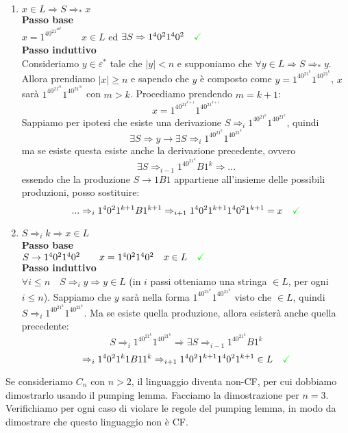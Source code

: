 \documentclass[a4paper,oneside]{scrbook}
\newcommand{\greenmark}{\quad \textcolor{green}{\checkmark}}
\begin{document}
\begin{enumerate}
	\item $x\in L \Rightarrow S \Rightarrow_* x $\\
	\textbf{Passo base}\\
	$x=1^40^21^40^2 \qquad x \in L$ ed $\exists S\Rightarrow 1^40^21^40^2 \greenmark $\\
	\textbf{Passo induttivo}\\
	Consideriamo $y \in \varepsilon^*$ tale che $|y|<n$ e supponiamo che $\forall y \in L \Rightarrow S \Rightarrow_* y$.\\
	Allora prendiamo $|x|\geq n$ e sapendo che $y$ è composto come $y=1^40^21^k1^40^21^k$, $x$ sarà $1^40^21^m1^40^21^m$ con $m>k$. Procediamo prendendo $m=k+1$:
	$$ x=1^40^21^{k+1}1^40^21^{k+1}$$
	Sappiamo per ipotesi che esiste una derivazione  $S\Rightarrow_i 1^40^21^k1^40^21^k$, quindi
	$$\exists S \Rightarrow y \rightarrow \exists S \Rightarrow_i 1^40^21^k1^40^21^k$$
	ma se esiste questa esiste anche la derivazione precedente, ovvero
	$$\exists S \Rightarrow_{i-1} 1^40^21^{k}B1^{k} \Rightarrow ...$$
	essendo che la produzione $S\rightarrow 1B1$ appartiene all'insieme delle possibili produzioni, posso sostituire:
	$$... \Rightarrow_i  1^40^21^{k+1}B1^{k+1} \Rightarrow_{i+1}  1^40^21^{k+1}1^40^21^{k+1} = x \greenmark$$
	
	\item $ S \Rightarrow_i k \Rightarrow x \in L$\\
	\textbf{Passo base}\\
	$S\rightarrow 1^40^21^40^2 \qquad x=1^40^21^40^2 \quad x \in L \greenmark $\\
	\textbf{Passo induttivo}\\
	$\forall i \leq n \quad S \Rightarrow_i y \Rightarrow y \in L $ (in $i$ passi otteniamo una stringa $\in L$, per ogni $i\leq n$).
	Sappiamo che $y$ sarà nella forma $1^40^21^k1^40^21^k$ visto che $\in L$, quindi $S \Rightarrow_i 1^40^21^k1^40^21^k$.
	Ma se esiste quella produzione, allora esisterà anche quella precedente:
	$$S \Rightarrow_i 1^40^21^k1^40^21^k \Rightarrow \exists S \Rightarrow_{i-1} 1^40^21^kB1^k$$
	$$\Rightarrow_i 1^40^21^k1B11^k \Rightarrow_{i+1} 1^40^21^{k+1}1^40^21^{k+1} \in L \greenmark$$
\end{enumerate}
Se consideriamo $C_n$ con $n>2$, il linguaggio diventa non-CF, per cui dobbiamo dimostrarlo usando il pumping lemma. Facciamo la dimostrazione per $n=3$.
Verifichiamo per ogni caso di violare le regole del pumping lemma, in modo da dimostrare che questo linguaggio non è CF.
\end{document}
